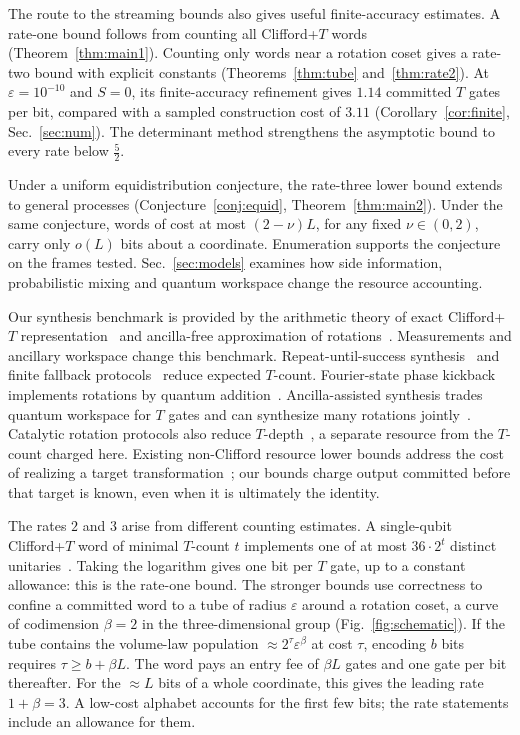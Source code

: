 \documentclass[aps,prx,twocolumn,superscriptaddress,nofootinbib,longbibliography]{revtex4-2}
\theoremstyle{plain}
\theoremstyle{definition}
\theoremstyle{remark}
\begin{document}
The route to the streaming bounds also gives useful finite-accuracy estimates. A rate-one bound follows from counting all Clifford+$T$ words (Theorem~\ref{thm:main1}). Counting only words near a rotation coset gives a rate-two bound with explicit constants (Theorems~\ref{thm:tube} and~\ref{thm:rate2}). At $\varepsilon=10^{-10}$ and $S=0$, its finite-accuracy refinement gives $1.14$ committed $T$ gates per bit, compared with a sampled construction cost of $3.11$ (Corollary~\ref{cor:finite}, Sec.~\ref{sec:num}). The determinant method strengthens the asymptotic bound to every rate below $\tfrac52$.

Under a uniform equidistribution conjecture, the rate-three lower bound extends to general processes (Conjecture~\ref{conj:equid}, Theorem~\ref{thm:main2}). Under the same conjecture, words of cost at most $(2-\nu)L$, for any fixed $\nu\in(0,2)$, carry only $o(L)$ bits about a coordinate. Enumeration supports the conjecture on the frames tested. Sec.~\ref{sec:models} examines how side information, probabilistic mixing and quantum workspace change the resource accounting.

Our synthesis benchmark is provided by the arithmetic theory of exact Clifford+$T$ representation~\cite{KMM13} and ancilla-free approximation of rotations~\cite{Selinger15,RossSelinger}. Measurements and ancillary workspace change this benchmark. Repeat-until-success synthesis~\cite{PaetznickSvore,BRS} and finite fallback protocols~\cite{PQF} reduce expected $T$-count. Fourier-state phase kickback implements rotations by quantum addition~\cite{JonesFourier,Gidney}. Ancilla-assisted synthesis trades quantum workspace for $T$ gates and can synthesize many rotations jointly~\cite{LKS,GKW}. Catalytic rotation protocols also reduce $T$-depth~\cite{Kim26}, a separate resource from the $T$-count charged here. Existing non-Clifford resource lower bounds address the cost of realizing a target transformation~\cite{BCHK}; our bounds charge output committed before that target is known, even when it is ultimately the identity.

The rates $2$ and $3$ arise from different counting estimates. A single-qubit Clifford+$T$ word of minimal $T$-count $t$ implements one of at most $36\cdot2^t$ distinct unitaries~\cite{MA08}. Taking the logarithm gives one bit per $T$ gate, up to a constant allowance: this is the rate-one bound. The stronger bounds use correctness to confine a committed word to a tube of radius $\varepsilon$ around a rotation coset, a curve of codimension $\beta=2$ in the three-dimensional group (Fig.~\ref{fig:schematic}). If the tube contains the volume-law population $\approx2^{\tau}\varepsilon^{\beta}$ at cost $\tau$, encoding $b$ bits requires $\tau\ge b+\beta L$. The word pays an entry fee of $\beta L$ gates and one gate per bit thereafter. For the $\approx L$ bits of a whole coordinate, this gives the leading rate $1+\beta=3$. A low-cost alphabet accounts for the first few bits; the rate statements include an allowance for them.
\end{document}
